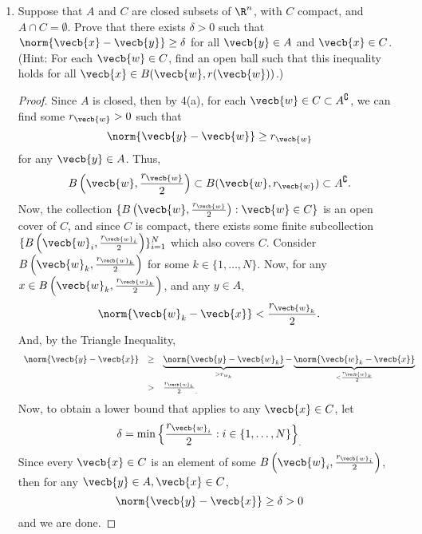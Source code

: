 \documentclass[letterpaper]{article}
\begin{document}
\begin{enumerate}
\begin{enumerate}[label=(\alph*)]
	\pagebreak
	\item Suppose that $A$ and $C$ are closed subsets of $\R^n$, with $C$ compact, and $A\cap C=\emptyset$. Prove that there exists $\delta>0$ such that $\norm{\vecb{x}-\vecb{y}}\geq\delta$ for all $\vecb{y}\in A$ and $\vecb{x}\in C$. (Hint: For each $\vecb{w} \in C$, find an open ball such that this inequality holds for all $\vecb{x} \in B(\vecb{w},r(\vecb{w}))$.)
	\begin{proof}
	Since $A$ is closed, then by 4(a), for each $\vecb{w}\in C\subset A^\complement$, we can find some ${r}_\vecb{w}>0$ such that 
	$$\norm{\vecb{y}-\vecb{w}}\geq{{r}_\vecb{w}}$$
	for any $\vecb{y}\in A$. Thus, 
	$$B\left(\vecb{w}, \frac{{r}_\vecb{w}}{2}\right) \subset	B(\vecb{w}, {r}_\vecb{w}) \subset A^\complement.$$
	Now, the collection $\{B\left(\vecb{w}, \frac{{r}_\vecb{w}}{2}\right):\vecb{w}\in C\}$ is an open cover of $C$, and since $C$ is compact, there exists some finite subcollection $\{B\left(\vecb{w}_i, \frac{{r}_{\vecb{w}_i}}{2}\right)\}_{i=1}^N$ which also covers $C$. Consider $B\left(\vecb{w}_k, \frac{{r}_{\vecb{w}_k}}{2}\right)$ for some $k\in \{1, \ldots, N\}$. Now, for any $x\in B\left(\vecb{w}_k, \frac{{r}_{\vecb{w}_k}}{2}\right)$, and any $y\in A$,
	$$\norm{\vecb{w}_k-\vecb{x}}<\frac{{r}_{\vecb{w}_k}}{2}.$$
	And, by the Triangle Inequality, 
	\[\begin{array}{rcl}
	\norm{\vecb{y}-\vecb{x}} &\geq& \underbrace{\norm{\vecb{y}-\vecb{w}_k}}_{>r_{w_k}}-\underbrace{\norm{\vecb{w}_k-\vecb{x}}}_{<\frac{{r}_{\vecb{w}_k}}{2}}\\
	&>&\frac{{r}_{\vecb{w}_k}}{2}_.
	\end{array}\]
	Now, to obtain a lower bound that applies to any $\vecb{x}\in C$, let 
	$$\delta=\min\left\lbrace\frac{{r}_{\vecb{w}_i}}{2}:i\in \{1, \ldots, N\}\right\rbrace_.$$
	Since every $\vecb{x}\in C$ is an element of some $B\left(\vecb{w}_i, \frac{{r}_{\vecb{w}_i}}{2}\right)$, then for any $\vecb{y}\in A, \vecb{x}\in C$, 
	$$\norm{\vecb{y}-\vecb{x}}\geq \delta > 0$$
	and we are done. 	
	\end{proof}
	

\end{enumerate}
\end{enumerate}
\end{document}
